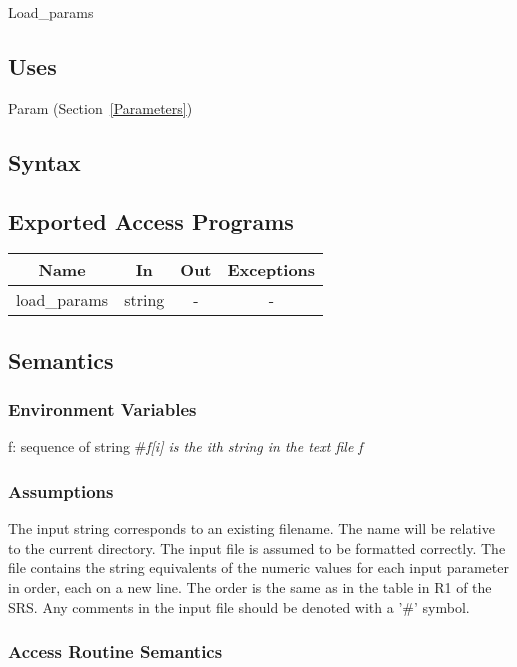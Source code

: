 \documentclass[12pt]{article}
\begin{document}
Load\_params

\subsection{Uses}

Param (Section~\ref{Parameters})

\subsection{Syntax}

\subsection{Exported Access Programs}

\begin{center}
\begin{tabular}{c c c c}
\hline
\textbf{Name} & \textbf{In} & \textbf{Out} & \textbf{Exceptions} \\
\hline
load\_params & string & - &  - \\
\hline
\end{tabular}
\end{center}

\subsection{Semantics}

\subsubsection{Environment Variables}

f: sequence of string \#\textit{f[i] is the ith string in the text file f}\\ 

\subsubsection{Assumptions}

The input string corresponds to an existing filename.  The name will be relative
to the current directory. The input file is assumed to be formatted
correctly. The file contains the string equivalents of the numeric values for
each input parameter in order, each on a new line. The order is the same as in
the table in R1 of the SRS. Any comments in the input file should be denoted
with a '\#' symbol.

\subsubsection{Access Routine Semantics}
\end{document}

